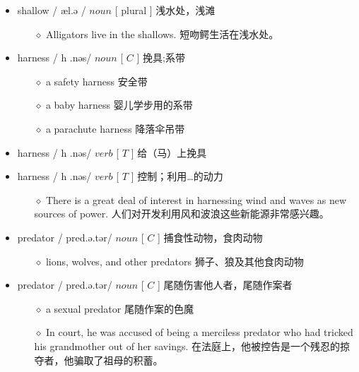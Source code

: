 \documentclass[a4paper,top=2.5cm,buttom=2.5cm10.5pt]{book}
\begin{document}
\begin{itemize}
\item shallow / \textprimstress  \textesh æl.ə \textupsilon / $ noun $ [ plural ] 浅水处，浅滩
\begin{itemize}
\item[$\diamond$] Alligators live in the shallows.
短吻鳄生活在浅水处。
\end{itemize}
\end{itemize}
\begin{itemize}
\item harness / \textprimstress h \textscripta  \textlengthmark .nəs/ $ noun $ [  $ C $  ] 挽具;系带
\begin{itemize}
\item[$\diamond$] a safety harness
安全带
\item[$\diamond$] a baby harness
婴儿学步用的系带
\item[$\diamond$] a parachute harness
降落伞吊带
\end{itemize}
\end{itemize}
\begin{itemize}
\item harness / \textprimstress h \textscripta  \textlengthmark .nəs/ $ verb $ [  $ T $  ] 给（马）上挽具
\end{itemize}
\begin{itemize}
\item harness / \textprimstress h \textscripta  \textlengthmark .nəs/ $ verb $ [  $ T $  ] 控制；利用…的动力
\begin{itemize}
\item[$\diamond$] There is a great deal of interest in harnessing wind and waves as new sources of power.
人们对开发利用风和波浪这些新能源非常感兴趣。
\end{itemize}
\end{itemize}
\begin{itemize}
\item predator / \textprimstress pred.ə.tər/ $ noun $ [  $ C $  ] 捕食性动物，食肉动物
\begin{itemize}
\item[$\diamond$] lions, wolves, and other predators
狮子、狼及其他食肉动物
\end{itemize}
\end{itemize}
\begin{itemize}
\item predator / \textprimstress pred.ə.tər/ $ noun $ [  $ C $  ] 尾随伤害他人者，尾随作案者
\begin{itemize}
\item[$\diamond$] a sexual predator
尾随作案的色魔
\item[$\diamond$] In court, he was accused of being a merciless predator who had tricked his grandmother out of her savings.
在法庭上，他被控告是一个残忍的掠夺者，他骗取了祖母的积蓄。
\end{itemize}
\end{itemize}
\end{document}
